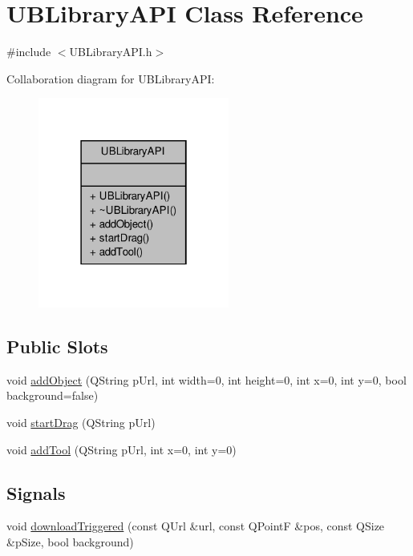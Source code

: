 \hypertarget{class_u_b_library_a_p_i}{\section{U\-B\-Library\-A\-P\-I Class Reference}
\label{da/dd6/class_u_b_library_a_p_i}
}


{\ttfamily \#include $<$U\-B\-Library\-A\-P\-I.\-h$>$}



Collaboration diagram for U\-B\-Library\-A\-P\-I\-:
\nopagebreak
\begin{figure}[H]
\begin{center}
\leavevmode
\includegraphics[width=178pt]{da/de7/class_u_b_library_a_p_i__coll__graph}
\end{center}
\end{figure}
\subsection*{Public Slots}
\begin{DoxyCompactItemize}
\item 
void \hyperlink{class_u_b_library_a_p_i_abeac23fcd7f64866d5686b590ec05695}{add\-Object} (Q\-String p\-Url, int width=0, int height=0, int x=0, int y=0, bool background=false)
\item 
void \hyperlink{class_u_b_library_a_p_i_a110c72e63025958bb57e3a48233d90ca}{start\-Drag} (Q\-String p\-Url)
\item 
void \hyperlink{class_u_b_library_a_p_i_a5b22ba9a9abbea688550df3388c46fc8}{add\-Tool} (Q\-String p\-Url, int x=0, int y=0)
\end{DoxyCompactItemize}
\subsection*{Signals}
\begin{DoxyCompactItemize}
\item 
void \hyperlink{class_u_b_library_a_p_i_a1ef8bf95667c801852e58a57925e192b}{download\-Triggered} (const Q\-Url \&url, const Q\-Point\-F \&pos, const Q\-Size \&p\-Size, bool background)
\end{DoxyCompactItemize}
